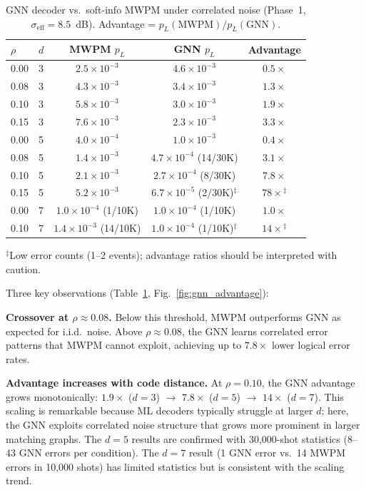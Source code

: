 \documentclass[twocolumn,showpacs,preprintnumbers,amsmath,amssymb,superscriptaddress]{revtex4-2}
\begin{document}
\begin{table}[h]
\caption{GNN decoder vs.\ soft-info MWPM under correlated noise (Phase~1, $\sigma_{\mathrm{eff}} = 8.5$~dB). Advantage = $p_L(\mathrm{MWPM})/p_L(\mathrm{GNN})$.}
\label{tab:gnn}
\begin{ruledtabular}
\begin{tabular}{lcccc}
$\rho$ & $d$ & MWPM $p_L$ & GNN $p_L$ & Advantage \\
\hline
0.00 & 3 & $2.5{\times}10^{-3}$ & $4.6{\times}10^{-3}$ & $0.5\times$ \\
0.08 & 3 & $4.3{\times}10^{-3}$ & $3.4{\times}10^{-3}$ & $1.3\times$ \\
0.10 & 3 & $5.8{\times}10^{-3}$ & $3.0{\times}10^{-3}$ & $1.9\times$ \\
0.15 & 3 & $7.6{\times}10^{-3}$ & $2.3{\times}10^{-3}$ & $3.3\times$ \\
\hline
0.00 & 5 & $4.0{\times}10^{-4}$ & $1.0{\times}10^{-3}$ & $0.4\times$ \\
0.08 & 5 & $1.4{\times}10^{-3}$ & $4.7{\times}10^{-4}$ (14/30K) & $3.1\times$ \\
0.10 & 5 & $2.1{\times}10^{-3}$ & $2.7{\times}10^{-4}$ (8/30K) & $7.8\times$ \\
0.15 & 5 & $5.2{\times}10^{-3}$ & $6.7{\times}10^{-5}$ (2/30K)$^\ddagger$ & $78\times$$^\ddagger$ \\
\hline
0.00 & 7 & $1.0{\times}10^{-4}$ (1/10K) & $1.0{\times}10^{-4}$ (1/10K) & $1.0\times$ \\
0.10 & 7 & $1.4{\times}10^{-3}$ (14/10K) & $1.0{\times}10^{-4}$ (1/10K)$^\ddagger$ & $14\times$$^\ddagger$ \\
\end{tabular}
\end{ruledtabular}
\footnotesize{$^\ddagger$Low error counts (1--2 events); advantage ratios should be interpreted with caution.}
\end{table}

Three key observations (Table~\ref{tab:gnn}, Fig.~\ref{fig:gnn_advantage}):

\textbf{Crossover at $\rho \approx 0.08$.} Below this threshold, MWPM outperforms GNN as expected for i.i.d.\ noise. Above $\rho \approx 0.08$, the GNN learns correlated error patterns that MWPM cannot exploit, achieving up to $7.8\times$ lower logical error rates.

\textbf{Advantage increases with code distance.} At $\rho = 0.10$, the GNN advantage grows monotonically: $1.9\times$ ($d = 3$) $\to$ $7.8\times$ ($d = 5$) $\to$ $14\times$ ($d = 7$). This scaling is remarkable because ML decoders typically struggle at larger $d$; here, the GNN exploits correlated noise structure that grows more prominent in larger matching graphs. The $d = 5$ results are confirmed with 30{,}000-shot statistics (8--43 GNN errors per condition). The $d = 7$ result (1 GNN error vs.\ 14 MWPM errors in 10{,}000 shots) has limited statistics but is consistent with the scaling trend.
\end{document}
